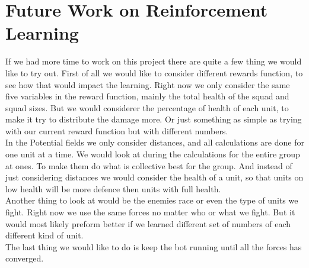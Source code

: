 \section{Future Work on Reinforcement Learning}
%

If we had more time to work on this project there are quite a few thing we would like to try out. First of all we would like to consider different rewards function, to see how that would impact the learning. Right now we only consider the same five variables in the reward function, mainly the total health of the squad and squad sizes. But we would considerer the percentage of health of each unit, to make it try to distribute the damage more. Or just something as simple as trying with our current reward function but with different numbers. \\

In the Potential fields we only consider distances, and all calculations are done for one unit at a time. We would look at during the calculations for the entire group at ones. To make them do what is collective best for the group. And instead of just considering distances we would consider the health of a unit, so that units on low health will be more defence then units with full health.\\

Another thing to look at would be the enemies race or even the type of units we fight. Right now we use the same forces no matter who or what we fight. But it would most likely preform better if we learned different set of numbers of each different kind of unit.\\

The last thing we would like to do is keep the bot running until all the forces has converged.